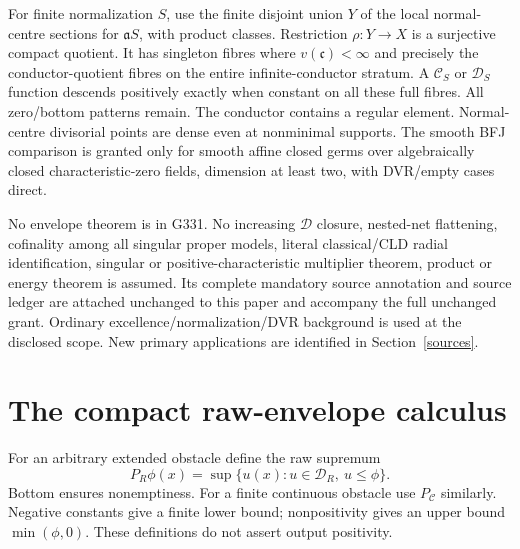 \documentclass[11pt]{article}
\newcommand{\C}{\mathcal C}
\newcommand{\D}{\mathcal D}
\newcommand{\aideal}{\mathfrak a}
\newcommand{\cond}{\mathfrak c}
\begin{document}
For finite normalization $S$, use the finite disjoint union $Y$ of the local
normal-centre sections for $\aideal S$, with product classes. Restriction
$\rho:Y\to X$ is a surjective compact quotient. It has singleton fibres where
$v(\cond)<\infty$ and precisely the conductor-quotient fibres on the entire
infinite-conductor stratum. A $\C_S$ or $\D_S$ function descends positively
exactly when constant on all these full fibres. All zero/bottom patterns remain.
The conductor contains a regular element. Normal-centre divisorial points
are dense even at nonminimal supports. The smooth BFJ comparison is granted
only for smooth affine closed germs over algebraically closed characteristic-zero
fields, dimension at least two, with DVR/empty cases direct.

No envelope theorem is in G331. No increasing $\D$ closure, nested-net
flattening, cofinality among all singular proper models, literal classical/CLD
radial identification, singular or positive-characteristic multiplier theorem,
product or energy theorem is assumed. Its complete mandatory source annotation
and source ledger are attached unchanged to this paper and accompany the full
unchanged grant. Ordinary excellence/normalization/DVR background is used at
the disclosed scope. New primary applications are identified in Section~\ref{sources}.

\section{The compact raw-envelope calculus}
For an arbitrary extended obstacle define the raw supremum
\[
 P_R\phi(x)=\sup\{u(x):u\in\D_R,\ u\le\phi\}.
\]
Bottom ensures nonemptiness. For a finite continuous obstacle use $P_{\C}$
similarly. Negative constants give a finite lower bound; nonpositivity gives
an upper bound $\min(\phi,0)$. These definitions do not assert output positivity.
\end{document}
